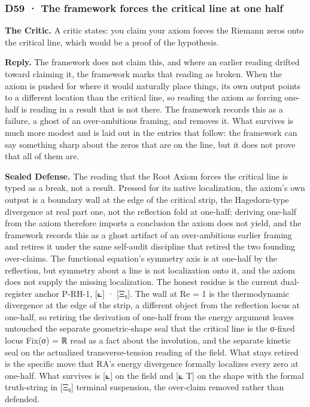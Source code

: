 \documentclass[10pt,twocolumn]{article}
\begin{document}
\hypertarget{d59-the-framework-forces-the-critical-line-at-one-half}{%
\subsubsection{D59 · The framework forces the critical line at one
half}\label{d59-the-framework-forces-the-critical-line-at-one-half}}

\textbf{The Critic.} A critic states: you claim your axiom forces the
Riemann zeros onto the critical line, which would be a proof of the
hypothesis.

\textbf{Reply.} The framework does not claim this, and where an earlier
reading drifted toward claiming it, the framework marks that reading as
broken. When the axiom is pushed for where it would naturally place
things, its own output points to a different location than the critical
line, so reading the axiom as forcing one-half is reading in a result
that is not there. The framework records this as a failure, a ghost of
an over-ambitious framing, and removes it. What survives is much more
modest and is laid out in the entries that follow: the framework can say
something sharp about the zeros that are on the line, but it does not
prove that all of them are.

\textbf{Sealed Defense.} The reading that the Root Axiom forces the
critical line is typed as a break, not a result. Pressed for its native
localization, the axiom's own output is a boundary wall at the edge of
the critical strip, the Hagedorn-type divergence at real part one, not
the reflection fold at one-half; deriving one-half from the axiom
therefore imports a conclusion the axiom does not yield, and the
framework records this as a ghost artifact of an over-ambitious earlier
framing and retires it under the same self-audit discipline that retired
the two founding over-claims. The functional equation's symmetry axis is
at one-half by the reflection, but symmetry about a line is not
localization onto it, and the axiom does not supply the missing
localization. The honest residue is the current dual-register anchor
P-RH-1, {[}⟀{]} · {[}Ξ₀{]}. The wall at Re = 1 is the thermodynamic
divergence at the edge of the strip, a different object from the
reflection locus at one-half, so retiring the derivation of one-half
from the energy argument leaves untouched the separate geometric-shape
seal that the critical line is the σ-fixed locus Fix(σ) = ℝ read as a
fact about the involution, and the separate kinetic seal on the
actualized transverse-tension reading of the field. What stays retired
is the specific move that RA's energy divergence formally localizes
every zero at one-half. What survives is {[}⟀{]} on the field and {[}⟀
T{]} on the shape with the formal truth-string in {[}Ξ₀{]} terminal
suspension, the over-claim removed rather than defended.
\end{document}
